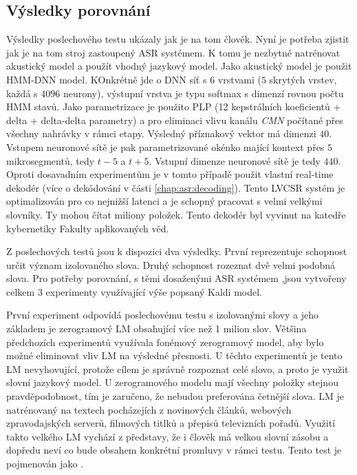 \subsection{Výsledky porovnání}
\label{chap:realisation:comparison}

Výsledky poslechového testu ukázaly jak je na tom člověk. Nyní je potřeba zjistit jak je na tom stroj zastoupený ASR systémem. K tomu je nezbytné natrénovat akustický model a použít vhodný jazykový model. Jako akustický model je použit HMM-DNN model. KOnkrétně jde o DNN síť s $6$ vrstvami ($5$ skrytých vrstev, každá s $4096$ neurony), výstupní vrstva je typu softmax s dimenzí rovnou počtu HMM stavů. Jako parametrizace je použito PLP (12 kepstrálních koeficientů + delta + delta-delta parametry) a pro eliminaci vlivu kanálu \textit{CMN} počítané přes všechny nahrávky v rámci etapy. Výsledný příznakový vektor má dimenzi $40$. Vstupem neuronové sítě je pak parametrizované okénko mající kontext přes $5$ mikrosegmentů, tedy $t-5$ a $t+5$. Vstupní dimenze neuronové sítě je tedy $440$. Oproti dosavadním experimentům je v tomto případě použit vlastní real-time dekodér (více o dekódování v části \ref{chap:asr:decoding}). Tento LVCSR systém je optimalizován pro co nejnižší latenci a je schopný pracovat s velmi velkými slovníky. Ty mohou čítat miliony položek. Tento dekodér byl vyvinut na katedře kybernetiky Fakulty aplikovaných věd.

Z poslechových testů jsou k dispozici dva výsledky. První reprezentuje schopnost určit význam izolovaného slova. Druhý schopnost rozeznat dvě velmi podobná slova. Pro potřeby porovnání, s těmi dosaženými ASR systémem ,jsou vytvořeny celkem $3$ experimenty využívající výše popsaný Kaldi model.

První experiment odpovídá poslechovému testu s izolovanými slovy a jeho základem je zerogramový LM obsahující více než 1 milion slov. Většina předchozích experimentů využívala fonémový zerogramový model, aby bylo možné eliminovat vliv LM na výsledné přesnosti. U těchto experimentů je tento LM nevyhovující, protože cílem je správně rozpoznat celé slovo, a proto je využit slovní jazykový model. U zerogramového modelu mají všechny položky stejnou pravděpodobnost, tím je zaručeno, že nebudou preferována četnější slova. LM je natrénovaný na textech pocházejích z novinových článků, webových zpravodajských serverů, filmových titlků a přepisů televizních pořadů. Využití takto velkého LM vychází z představy, že i člověk má velkou slovní zásobu a dopředu neví co bude obsahem konkrétní promluvy v rámci testu. Tento test je pojmenován jako .

